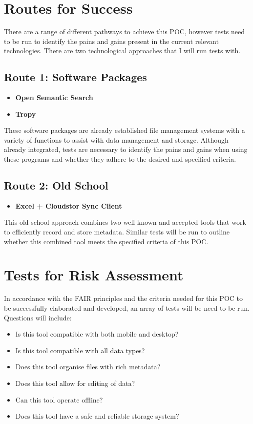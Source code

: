\documentclass{article}
\begin{document}
\clearpage

\section{Routes for Success}
There are a range of different pathways to achieve this POC, however tests need to be run to identify the pains and gains present in the current relevant technologies. There are two technological approaches that I will run tests with. 
\subsection{Route 1: Software Packages}

\begin{itemize}
\item \textbf{Open Semantic Search}
\item \textbf{Tropy}
\end{itemize}
These software packages are already established file management systems with a variety of functions to assist with data management and storage. Although already integrated, tests are necessary to identify the pains and gains when using these programs and whether they adhere to the desired and specified criteria.

\subsection{Route 2: Old School}
\begin{itemize}
\item \textbf{Excel + Cloudstor Sync Client}
\end{itemize}
This old school approach combines two well-known and accepted tools that work to efficiently record and store metadata. Similar tests will be run to outline whether this combined tool meets the specified criteria of this POC.

\section{Tests for Risk Assessment}
In accordance with the FAIR principles and the criteria needed for this POC to be successfully elaborated and developed, an array of tests will be need to be run. Questions will include:
\begin{itemize}
\item Is this tool compatible with both mobile and desktop?
\item Is this tool compatible with all data types?
\item Does this tool organise files with rich metadata?
\item Does this tool allow for editing of data?
\item Can this tool operate offline?
\item Does this tool have a safe and reliable storage system?
\end{itemize}
\end{document}
